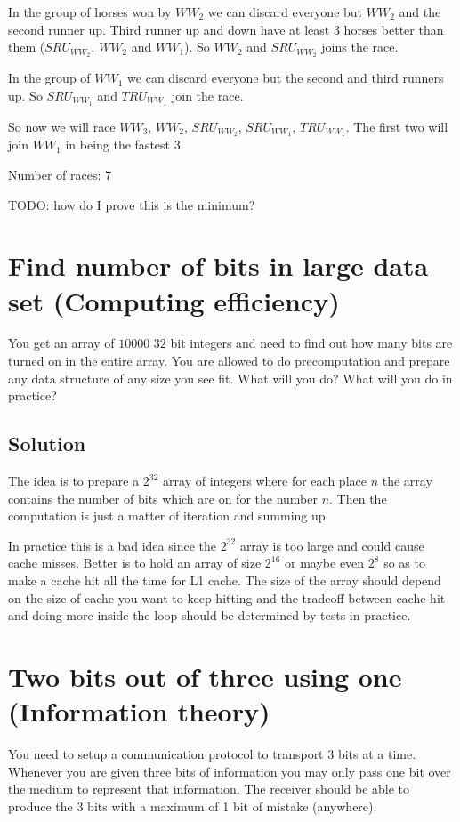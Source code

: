 \documentclass{article}
\begin{document}
In the group of horses won by $WW_2$ we can discard everyone but $WW_2$ and the second runner up. Third runner up and down have at least 3 horses better than them ($SRU_{WW_2}$, $WW_2$ and $WW_1$). So $WW_2$ and $SRU_{WW_2}$ joins the race.

In the group of $WW_1$ we can discard everyone but the second and third runners up. So $SRU_{WW_1}$ and $TRU_{WW_1}$ join the race.

So now we will race $WW_3$, $WW_2$, $SRU_{WW_2}$, $SRU_{WW_1}$, $TRU_{WW_1}$. The first two will join $WW_1$ in being the fastest 3.

Number of races: 7

TODO: how do I prove this is the minimum?

\section {Find number of bits in large data set (Computing efficiency)}
You get an array of $10000$ $32$ bit integers and need to find out how many bits are turned on in the entire array.
You are allowed to do precomputation and prepare any data structure of any size you see fit. What will you do? What will you do in practice?

\subsection{Solution}
The idea is to prepare a $2^{32}$ array of integers where for each place $n$ the array contains the number of bits which are on for the number $n$. Then the computation is just a matter of iteration and summing up.

In practice this is a bad idea since the $2^{32}$ array is too large and could cause cache misses. Better is to hold an array of size $2^{16}$ or maybe even $2^{8}$ so as to make a cache hit all the time for L1 cache. The size of the array should depend on the size of cache you want to keep hitting and the tradeoff between cache hit and doing more inside the loop should be determined by tests in practice.

\section {Two bits out of three using one (Information theory)}
You need to setup a communication protocol to transport $3$ bits at a time. Whenever you are given three bits of information you may only pass one bit over the medium to represent that information. The receiver should be able to produce the $3$ bits with a maximum of 1 bit of mistake (anywhere).
\end{document}
